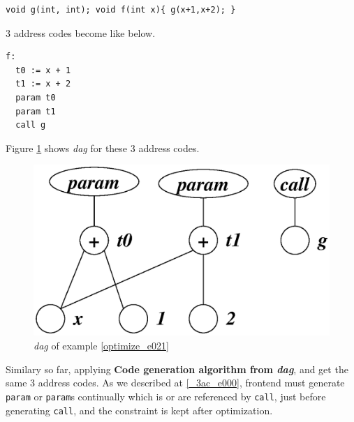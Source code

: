 \begin{Example}
\label{optimize_e021}
\begin{verbatim}
void g(int, int); void f(int x){ g(x+1,x+2); }
\end{verbatim}
3 address codes become like below.
\begin{verbatim}
f:
  t0 := x + 1
  t1 := x + 2
  param t0
  param t1
  call g
\end{verbatim}
Figure \ref{optimize_e022} shows {\em dag} for these 3 address codes.
\begin{figure}[htbp]
\begin{center}
\includegraphics[width=0.8\linewidth,height=0.470\linewidth]{opt009.eps}
\caption{{\em dag} of example \ref{optimize_e021}}
\label{optimize_e022}
\end{center}
\end{figure}
Similary so far, applying {\bf Code generation algorithm from {\em
 dag}}, and get the same 3 address codes.
As we described at \ref{_3ac_e000}, frontend must 
generate {\tt{param}} or {\tt{param}}s continually
which is or are referenced by {\tt{call}}, just before generating
{\tt{call}}, and the constraint is kept after optimization.
\end{Example}

